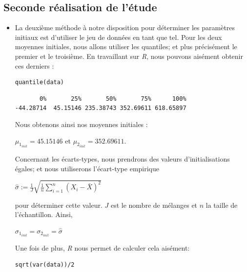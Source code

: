 \documentclass[frenchb]{report}
\newcommand{\1}{\mathbbm{1}}
\theoremstyle{definition}\newtheorem{defn}{Définition}
\theoremstyle{definition}\newtheorem{exm}{Exemple}
\theoremstyle{definition}\newtheorem{nota}{Notation}
\theoremstyle{definition}\newtheorem{rem}{Remarque}
\begin{document}
\begin{itemize}[label=\adfflowerleft]
\subsection{Seconde réalisation de l'étude}

\begin{itemize}[label=\adfflowerleft]

\item La deuxième méthode à notre disposition pour déterminer les paramètres initiaux est d'utiliser le jeu de données en tant que tel. Pour les deux moyennes initiales, nous allons utiliser les quantiles; et plus précisément le premier et le troisième. En travaillant sur \textit{R}, nous pouvons aisément obtenir ces derniers :

\begin{lstlisting}
quantile(data)
\end{lstlisting}


\begin{verbatim}
       0%       25%       50%       75%      100% 
-44.28714  45.15146 235.38743 352.69611 618.65897
\end{verbatim}
Nous obtenons ainsi nos moyennes initiales :
\begin{center} 
$\mu_{1_{init}} =  45.15146$ et $\mu_{2_{init}} = 352.69611$. 
\end{center}

Concernant les écarts-types, nous prendrons des valeurs d'initialisations égales; et nous utiliserons l'écart-type empirique  
\begin{center}
$\widehat{\sigma} := \displaystyle\frac{1}{J}\sqrt{\displaystyle\frac{1}{n}\sum_{i=1}^n(X_i - \bar{X})^2}$
\end{center}
pour déterminer cette valeur. $J$ est le nombre de mélanges et $n$ la taille de l'échantillon. \newline
Ainsi, 
\begin{center}
$\sigma_{1_{init}} = \sigma_{2_{init}} = \widehat{\sigma}$
\end{center}

Une fois de plus, \textit{R} nous permet de calculer cela aisément: 

\begin{lstlisting}
sqrt(var(data))/2
\end{lstlisting}


\end{itemize}
\end{itemize}
\end{document}
